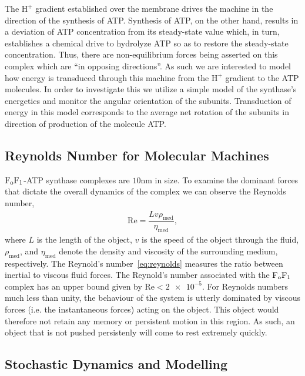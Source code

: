 \documentclass[10pt]{article}
\newcommand{\fofI}{\mathrm{F}_{\rm o}\mathrm{F}_{1}}
\begin{document}
The $\mathrm{H}^{+}$ gradient established over the membrane drives the machine 
in the direction of the synthesis of ATP. Synthesis of ATP, on the other hand, results in a deviation of 
ATP concentration from its steady-state value which, in turn, establishes a chemical drive 
to hydrolyze ATP so as to restore the steady-state concentration. Thus, there are non-equilibrium
forces being asserted on this complex which are ``in opposing directions''. As such we are interested to 
model how energy is transduced through this machine from the $\mathrm{H}^{+}$ gradient to the ATP
molecules. In order to investigate this we utilize a simple model of the synthase's energetics and monitor 
the angular orientation of the subunits. Transduction of energy in this model corresponds to the average 
net rotation of the subunits in direction of production of the molecule ATP.  

\subsection{Reynolds Number for Molecular Machines}

$\fofI$-ATP synthase complexes are $10\si{\nano\meter}$ in size. To examine the dominant forces that dictate the 
overall dynamics of the complex we can observe the Reynolds number,
\begin{align}
    \mathrm{Re} = \dfrac{Lv\rho_{\mathrm{med}}}{\eta_{\mathrm{med}}},\label{eq:reynolds}
\end{align}
where $L$ is the length of the object, $v$ is the speed of the object through the fluid, $\rho_{\mathrm{med}}$, and $\eta_{\mathrm{med}}$ denote the density and viscosity of the surrounding medium, respectively. The Reynold's number~\eqref{eq:reynolds} measures the ratio between inertial to viscous fluid forces. The Reynold's number associated with the $\fofI$ complex has an upper bound given by $\mathrm{Re} < \num{2e-5}$. For Reynolds numbers much less than unity, the behaviour of the system is utterly dominated by viscous forces (i.e. the instantaneous forces)  acting on the object. This object would therefore not retain any memory or persistent motion in this region. As such, an object that is not pushed persistenly will come to rest extremely quickly. 

\subsection{Stochastic Dynamics and Modelling}
\end{document}
